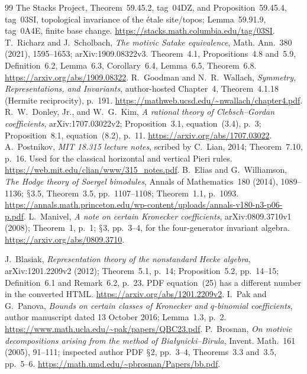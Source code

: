 \documentclass[11pt,a4paper]{article}
\renewcommand{\S}{\ensuremath{\mathsection}}
\theoremstyle{named}\newtheorem{finding}{Finding}[section]
\theoremstyle{definition}\newtheorem{definition}[finding]{Definition}
\theoremstyle{remark}\newtheorem{remark}[finding]{Remark}
\begin{document}
\begin{thebibliography}{99}
 The Stacks Project, Theorem~59.45.2, tag~04DZ, and Proposition~59.45.4, tag~03SI, topological invariance of the \'etale site/topos; Lemma~59.91.9, tag~0A4E, finite base change. \url{https://stacks.math.columbia.edu/tag/03SI}.
 T.~Richarz and J.~Scholbach, \emph{The motivic Satake equivalence}, Math. Ann.~380 (2021), 1595--1653; arXiv:1909.08322v3. Theorem~4.1, Propositions~4.8 and~5.9, Definition~6.2, Lemma~6.3, Corollary~6.4, Lemma~6.5, Theorem~6.8. \url{https://arxiv.org/abs/1909.08322}.
 R.~Goodman and N.~R.~Wallach, \emph{Symmetry, Representations, and Invariants}, author-hosted Chapter~4, Theorem~4.1.18 (Hermite reciprocity), p.~191. \url{https://mathweb.ucsd.edu/~nwallach/chapter4.pdf}.
 R.~W.~Donley, Jr., and W.~G.~Kim, \emph{A rational theory of Clebsch--Gordan coefficients}, arXiv:1707.03022v2; Proposition~3.1, equation~(3.4), p.~3; Proposition~8.1, equation~(8.2), p.~11. \url{https://arxiv.org/abs/1707.03022}.
 A.~Postnikov, \emph{MIT 18.315 lecture notes}, scribed by C.~Lian, 2014; Theorem~7.10, p.~16. Used for the classical horizontal and vertical Pieri rules. \url{https://web.mit.edu/clian/www/315_notes.pdf}.
 B.~Elias and G.~Williamson, \emph{The Hodge theory of Soergel bimodules}, Annals of Mathematics~180 (2014), 1089--1136; \S3.5, Theorem~3.5, pp.~1107--1108; Theorem~1.1, p.~1093. \url{https://annals.math.princeton.edu/wp-content/uploads/annals-v180-n3-p06-p.pdf}.
 L.~Manivel, \emph{A note on certain Kronecker coefficients}, arXiv:0809.3710v1 (2008); Theorem~1, p.~1; \S3, pp.~3--4, for the four-generator invariant algebra. \url{https://arxiv.org/abs/0809.3710}.

 J.~Blasiak, \emph{Representation theory of the nonstandard Hecke algebra}, arXiv:1201.2209v2 (2012); Theorem~5.1, p.~14; Proposition~5.2, pp.~14--15; Definition~6.1 and Remark~6.2, p.~23. PDF equation~(25) has a different number in the converted HTML. \url{https://arxiv.org/abs/1201.2209v2}.
 I.~Pak and G.~Panova, \emph{Bounds on certain classes of Kronecker and $q$-binomial coefficients}, author manuscript dated 13 October 2016; Lemma~1.3, p.~2. \url{https://www.math.ucla.edu/~pak/papers/QBC23.pdf}.
 P.~Brosnan, \emph{On motivic decompositions arising from the method of Bia\l ynicki--Birula}, Invent. Math.~161 (2005), 91--111; inspected author PDF \S2, pp.~3--4, Theorems~3.3 and~3.5, pp.~5--6. \url{https://math.umd.edu/~pbrosnan/Papers/bb.pdf}.



\end{thebibliography}
\end{document}
